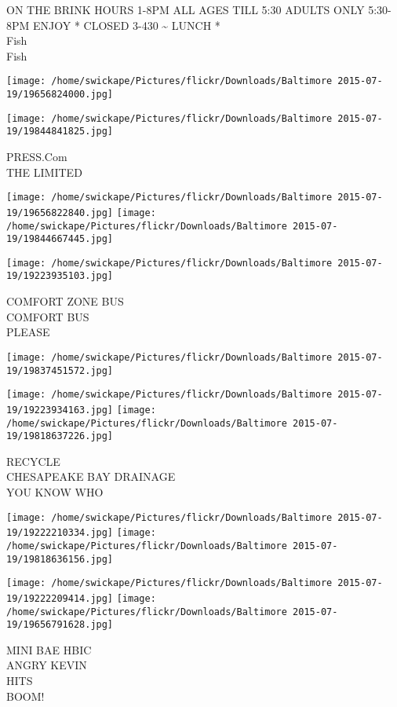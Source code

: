 \documentclass[10pt,letterpaper]{article}
\begin{document}
ON THE BRINK HOURS 1{-}8PM ALL AGES TILL 5:30 ADULTS ONLY 5:30{-}8PM ENJOY * CLOSED 3{-}430 \textasciitilde{} LUNCH *\\
Fish\\
Fish
\pagebreak

\texttt{[image: /home/swickape/Pictures/flickr/Downloads/Baltimore 2015-07-19/19656824000.jpg]}

\vspace{0.25in}
\texttt{[image: /home/swickape/Pictures/flickr/Downloads/Baltimore 2015-07-19/19844841825.jpg]}

PRESS.Com\\
THE LIMITED
\pagebreak

\texttt{[image: /home/swickape/Pictures/flickr/Downloads/Baltimore 2015-07-19/19656822840.jpg]}
\texttt{[image: /home/swickape/Pictures/flickr/Downloads/Baltimore 2015-07-19/19844667445.jpg]}

\vspace{0.25in}
\texttt{[image: /home/swickape/Pictures/flickr/Downloads/Baltimore 2015-07-19/19223935103.jpg]}

COMFORT ZONE BUS\\
COMFORT BUS\\
PLEASE
\pagebreak

\texttt{[image: /home/swickape/Pictures/flickr/Downloads/Baltimore 2015-07-19/19837451572.jpg]}

\vspace{0.25in}
\texttt{[image: /home/swickape/Pictures/flickr/Downloads/Baltimore 2015-07-19/19223934163.jpg]}
\texttt{[image: /home/swickape/Pictures/flickr/Downloads/Baltimore 2015-07-19/19818637226.jpg]}

RECYCLE\\
CHESAPEAKE BAY DRAINAGE\\
YOU KNOW WHO
\pagebreak

\texttt{[image: /home/swickape/Pictures/flickr/Downloads/Baltimore 2015-07-19/19222210334.jpg]}
\texttt{[image: /home/swickape/Pictures/flickr/Downloads/Baltimore 2015-07-19/19818636156.jpg]}

\texttt{[image: /home/swickape/Pictures/flickr/Downloads/Baltimore 2015-07-19/19222209414.jpg]}
\texttt{[image: /home/swickape/Pictures/flickr/Downloads/Baltimore 2015-07-19/19656791628.jpg]}

MINI BAE HBIC\\
ANGRY KEVIN\\
HITS\\
BOOM!
\pagebreak
\end{document}
